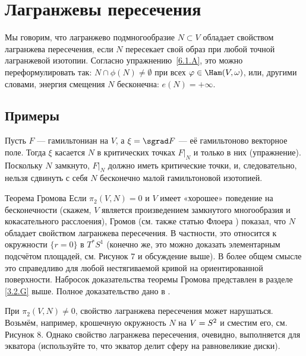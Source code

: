 \section{Лагранжевы пересечения}

Мы говорим, что лагранжево подмногообразие $N \subset V$ обладает свойством лагранжева пересечения, если $N$ пересекает свой образ при любой точной лагранжевой изотопии.
Согласно упражнению~\ref{6.1.A}, это можно переформулировать так: $N \cap \phi (N) \ne \emptyset$ при всех $\phi \in \Ham (V, \omega)$, или, другими словами, энергия смещения $N$ бесконечна: $e (N) = + \infty$.

\subsection*{Примеры} 

\begin{thm}{}
  
Пусть $F$ ---  гамильтониан на $V$, а $\xi = \sgrad F$ --- её гамильтоново
векторное поле. 
Тогда $\xi$ касается $N$ в критических точках $F|_N$ и только в них
(упражнение). 
Поскольку $N$ замкнуто, $F|_N$ должно иметь критические точки, и,
следовательно, нельзя сдвинуть с себя $N$ бесконечно малой
гамильтоновой изотопией. 
\end{thm}


%
\begin{thm}{Теорема Громова}\label{6.2.B} 
Если $\pi_2 (V, N) = 0$ и $V$ имеет «хорошее» поведение на
бесконечности (скажем, $V$ является произведением замкнутого
многообразия и кокасательного расслоения), Громов \cite{G1} (см. также
статью Флоера \cite{F}) показал, что $N$ обладает свойством лагранжева
пересечения. 
В частности, это относится к окружности $\{r = 0\}$ в $T^\ast S^1$
(конечно же, это можно доказать элементарным подсчётом площадей,
см. Рисунок 7 и обсуждение выше). 
В более общем смысле это справедливо для любой нестягиваемой кривой на
ориентированной поверхности. 
Набросок доказательства теоремы Громова представлен в разделе \ref{3.2.G} выше.
Полное доказательство дано в \cite[Chap. X]{AL}. 

При $\pi_2 (V, N) \ne 0$, свойство лагранжева пересечения может нарушаться.
Возьмём, например, крошечную окружность $N$ на $V \z= S^2$ и сместим его, см. Рисунок 8.
Однако свойство лагранжева пересечения, очевидно, выполняется для экватора (используйте то, что экватор делит сферу на равновеликие диски).
\end{thm}




